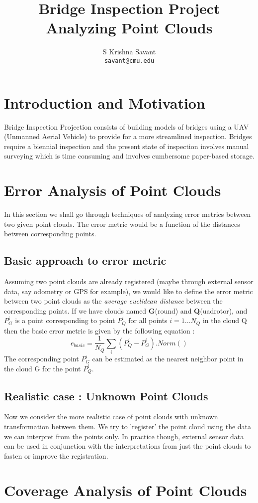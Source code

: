 \documentclass[notitlepage]{article}
\title{Bridge Inspection Project\\[1cm]\textbf{Analyzing Point Clouds}\\[1cm]}
\author{S Krishna Savant\\
        \texttt{savant@cmu.edu}\\
        }
\begin{document}
\maketitle

\tableofcontents

\pagebreak

\section{Introduction and Motivation}
Bridge Inspection Projection consists of building models of bridges using a UAV (Unmanned Aerial Vehicle) to provide for a more streamlined inspection. 
Bridges require a biennial inspection and the present state of inspection involves manual surveying which is time consuming and involves cumbersome paper-based storage.

\section{Error Analysis of Point Clouds}
    In this section we shall go through techniques of analyzing error metrics between two given point clouds.
    The error metric would be a function of the distances between corresponding points.

    \subsection{Basic approach to error metric}
    Assuming two point clouds are already registered (maybe through external sensor data, say odometry or GPS for example), we would like to define the error metric between two point clouds as the \emph{average euclidean distance} between the corresponding points.
    If we have clouds named \textbf{G}(round) and \textbf{Q}(uadrotor), and $P_{G}^{i}$ is a point corresponding to point $P_Q^i$ for all points $i=1...N_Q$ in the cloud Q then the basic error metric is given by the following equation :
    $$ e_{basic} = \frac{1}{N_Q} \sum_{i} (P_Q^{i}-P_G^i).Norm()$$
    The corresponding point $P_G^i$ can be estimated as the nearest neighbor point in the cloud G for the point $P_Q^i$.

    \subsection{Realistic case : Unknown Point Clouds}
    Now we consider the more realistic case of point clouds with unknown transformation between them.
    We try to 'register' the point cloud using the data we can interpret from the points only.
    In practice though, external sensor data can be used in conjunction with the interpretations from just the point clouds to fasten or improve the registration.

\section{Coverage Analysis of Point Clouds}
    \subsection{}
\end{document}
